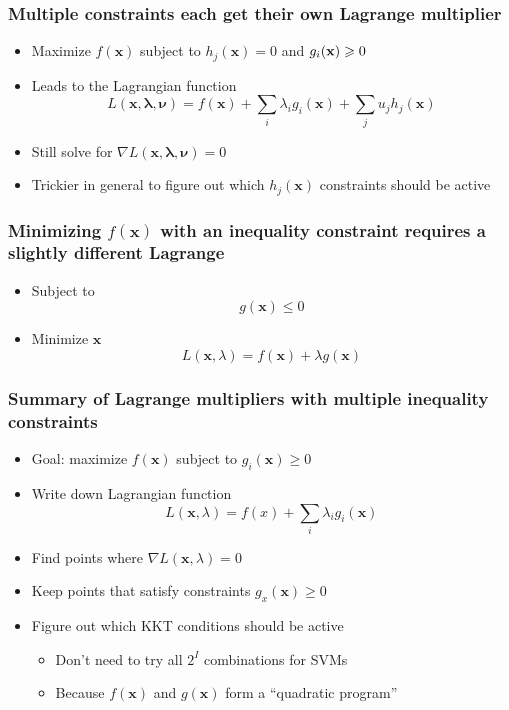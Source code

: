 \documentclass[12pt,notes,mathserif]{beamer}
\begin{document}
\begin{frame}[c]
	\frametitle{Multiple constraints each get their own Lagrange multiplier}
	\begin{itemize}
		\item Maximize $f(\mathbf{x})$ subject to $h_j(\mathbf{x})= 0$ and $g_i(\mathbf{x})\geqslant{}0$
		\item Leads to the Lagrangian function
		      \[
			      L(\mathbf{x,\lambda,\nu})=f(\mathbf{x})+\sum_i \lambda_ig_i(\mathbf{x})+\sum_ju_jh_j(\mathbf{x})
		      \]
		\item Still solve for $\nabla L(\mathbf{x,\lambda,\nu})= 0$
		\item Trickier in general to figure out which $h_j(\mathbf{x})$ constraints should be active
	\end{itemize}
\end{frame}



\begin{frame}[c]
	\frametitle{Minimizing $f(\mathbf{x})$ with an inequality constraint requires a slightly different Lagrange}
	\begin{itemize}
		\item Subject to
		      \[
			      g(\mathbf{x}) \le 0
		      \]

		\item Minimize \wrt $\mathbf{x}$
		      \[
			      L(\mathbf{x},\lambda)=f(\mathbf{x})+\lambda g(\mathbf{x})
		      \]
	\end{itemize}
\end{frame}


\begin{frame}[c]
	\frametitle{Summary of Lagrange multipliers with multiple inequality constraints}
	\begin{itemize}
		\item Goal: maximize $f(\mathbf{x})$ subject to $g_i(\mathbf{x})\geqslant{} 0$
		\item Write down Lagrangian function
		      \[
			      L(\mathbf{x},\lambda)=f(x)+\sum_i\lambda_ig_i(\mathbf{x})
		      \]
		\item Find points where $\nabla L(\mathbf{x},\lambda)= 0$
		\item Keep points that satisfy constraints $g_x(\mathbf{x})\geqslant{}0$
		\item Figure out which KKT conditions should be active
		      \begin{itemize}
			      \item Don't need to try all $2^I$ combinations for SVMs
			      \item Because $f(\mathbf{x})$ and $g(\mathbf{x})$ form a ``quadratic program''
		      \end{itemize}
	\end{itemize}
\end{frame}
\end{document}
